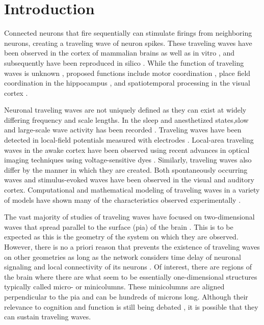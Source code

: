 \documentclass[12pt]{article}
\begin{document}
\section{Introduction} 
Connected neurons that fire sequentially can stimulate firings from neighboring neurons, creating a traveling wave of neuron spikes. 
\color{red}These traveling waves have been observed in the cortex of mammalian brains \parencite{Muller2018}\parencite{reimer2010}  as well as in vitro \parencite{wu2008}\parencite{huang2004}\parencite{Colomb1999}, and subsequently have been reproduced in silico \parencite{keane2015}\parencite{Senk2018}\parencite{Golomb1996}\parencite{ermentrout2001}. 
While the function of traveling waves is unknown \parencite{wu2008}\parencite{Muller2018}, proposed functions include motor coordination \parencite{Rubino2006}, place field coordination in the hippocampus \parencite{lubernov2009}, and spatiotemporal processing in the visual cortex \parencite{wu2008}\parencite{Muller2014}.

\color{black}Neuronal traveling waves are not uniquely defined as they can exist at widely differing frequency and scale lengths.  
In the sleep and anesthetized states,slow and large-scale wave activity has been recorded \parencite{Muller2018}. 
Traveling waves have been detected in local-field potentials measured with electrodes \cite{Rubino2006}\parencite{sanes1993}.
Local-area traveling waves in the awake cortex have been observed using recent advances in optical imaging techniques using voltage-sensitive dyes \parencite{wu2008}\parencite{Shoham1999}\color{red}\parencite{Xu2007}\color{black}.  
Similarly, traveling waves also differ by the manner in which they are created. 
Both spontaneously occurring waves and stimulus-evoked \parencite{reimer2010} waves have been observed in the visual and auditory cortex. 
Computational and mathematical modeling of traveling waves in a variety of models have shown many of the characteristics observed experimentally \parencite{ermentrout2001}\parencite{keane2015}\parencite{gibson2009}.

The vast majority of studies of traveling waves have focused on two-dimensional waves that spread parallel to the surface (pia) of the brain \color{red}\parencite{Wilson1973}\color{black}\parencite{reimer2010}\parencite{keane2015}\color{red}\cite{Townsend2018}\parencite{Golomb1997}\color{black}. 
This is to be expected as this is the geometry of the system on which they are observed. 
However, there is no a priori reason that prevents the existence of traveling waves on other geometries as long as the network considers time delay of neuronal signaling and local connectivity of its neurons \parencite{ermentrout2001}\parencite{Senk2018}. 
Of interest, there are regions of the brain where there are what seem to be essentially one-dimensional structures \parencite{buxhoeveden2002}\parencite{mountcastle1997} typically called micro- or minicolumns. 
These minicolumns are aligned perpendicular to the pia and can be hundreds of microns long.  
Although their relevance to cognition and function is still being debated \parencite{horton2005}\parencite{Cruz2009}\parencite{DaCosta2010}\parencite{buxhoeveden2002}\color{red}\parencite{rockland2004}\color{black}, it is possible that they can sustain traveling waves.
\end{document}
